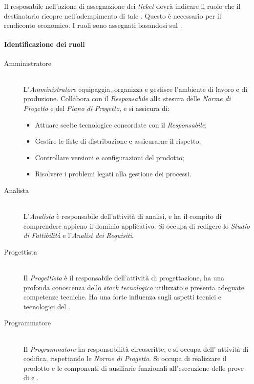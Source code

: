 Il resposabile nell'azione di assegnazione dei \textit{ticket} dovr\`a indicare il ruolo che il destinatario ricopre nell'adempimento di tale . Questo \`e necessario per il rendiconto economico. I ruoli sono assegnati basandosi sul \PianoDiProgetto.

\paragraph*{Identificazione dei ruoli}

\begin{description}

\item[Amministratore] \hfill \\ L'\textit{Amministratore} equipaggia, organizza e gestisce l'ambiente di lavoro e di produzione. Collabora con il \textit{Responsabile} alla stesura delle \textit{Norme di Progetto} e del \textit{Piano di Progetto}, e si assicura di:
  \begin{itemize}

  \item Attuare scelte tecnologice concordate con il \textit{Responsabile};
  \item Gestire le liste di distribuzione e assicurarne il rispetto;
  \item Controllare versioni e configurazioni del prodotto;
  \item Risolvere i problemi legati alla gestione dei processi.
    
  \end{itemize}

\item[Analista] \hfill \\ L'\textit{Analista} \`e responsabile dell'attivit\`a di analisi, e ha il compito di comprendere appieno il dominio applicativo. Si occupa di redigere lo \textit{Studio di Fattibilit\`a} e l'\textit{Analisi dei Requisiti}.

\item[Progettista] \hfill \\ Il \textit{Progettista} \`e il responsabile dell'attivit\`a di progettazione, ha una profonda conoscenza dello \textit{stack tecnologico} utilizzato e presenta adeguate competenze tecniche. Ha una forte influenza sugli aspetti tecnici e tecnologici del .

\item[Programmatore] \hfill \\ Il \textit{Programmatore} ha responsabilit\`a circoscritte, e si occupa dell' attivit\`a di codifica, rispettando le \textit{Norme di Progetto}. Si occupa di realizzare il prodotto e le componenti di ausiliarie funzionali all'esecuzione delle prove di  e .


\end{description}
